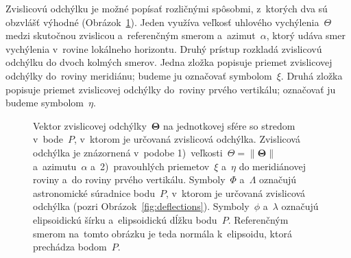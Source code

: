 \documentclass[a4paper, 12pt]{book}
\begin{document}
Zvislicovú odchýlku je možné popísať rozličnými spôsobmi, z~ktorých dva sú 
obzvlášť výhodné (Obrázok~\ref{fig:deflections_unit_sphere}).  Jeden využíva 
veľkosť uhlového vychýlenia~$\Theta$ medzi skutočnou zvislicou a~referenčným 
smerom a~azimut~$\alpha$, ktorý udáva smer vychýlenia v~rovine lokálneho 
horizontu.  Druhý prístup rozkladá zvislicovú odchýlku do dvoch kolmých smerov.  
Jedna zložka popisuje priemet zvislicovej odchýlky do~roviny meridiánu; budeme 
ju označovať symbolom~$\xi$.  Druhá zložka popisuje priemet zvislicovej 
odchýlky do~roviny prvého vertikálu; označovať ju budeme symbolom~$\eta$.

\begin{figure}[bt]
\centering

\caption{Vektor zvislicovej odchýlky~$\boldsymbol\Theta$ na jednotkovej sfére 
so stredom v~bode~$P$, v~ktorom je určovaná zvislicová odchýlka.  Zvislicová 
odchýlka je znázornená v~podobe 1)~veľkosti~$\Theta = \| \boldsymbol\Theta \|$ 
a~azimutu~$\alpha$ a~2)~pravouhlých priemetov~$\xi$ a~$\eta$ do meridiánovej 
roviny a~do roviny prvého vertikálu.  Symboly~$\Phi$ a~$\Lambda$ označujú 
astronomické súradnice bodu~$P$, v~ktorom je určovaná zvislicová odchýlka 
(pozri Obrázok~\ref{fig:deflections}).  Symboly~$\phi$ a~$\lambda$ označujú 
elipsoidickú šírku a~elipsoidickú dĺžku bodu~$P$.  Referenčným smerom na~tomto 
obrázku je teda normála k~elipsoidu, ktorá prechádza bodom~$P$.}
\label{fig:deflections_unit_sphere}
\end{figure}
\end{document}
